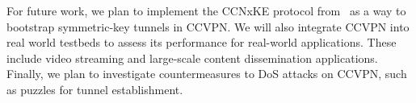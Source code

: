 \documentclass[conference,letterpaper,10pt]{IEEEtran}
\begin{document}
For future work, we plan to implement the CCNxKE protocol from~\cite{ccnxke} as a
way to bootstrap symmetric-key tunnels in CCVPN. We will also integrate CCVPN into
real world testbeds to assess its performance for real-world applications. These
include video streaming and large-scale content dissemination applications. Finally,
we plan to investigate countermeasures to DoS attacks on CCVPN, such as puzzles for tunnel establishment.

\ifCLASSOPTIONcaptionsoff
  \newpage
\fi

\tiny




\end{document}
